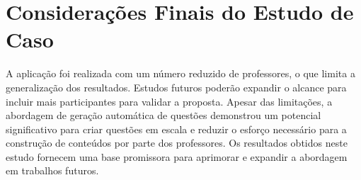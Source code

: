 \section{Considerações Finais do Estudo de Caso}
A aplicação foi realizada com um número reduzido de professores, o que limita a generalização dos resultados. Estudos futuros poderão expandir o alcance para incluir mais participantes para validar a proposta. Apesar das limitações, a abordagem de geração automática de questões demonstrou um potencial significativo para criar questões em escala e reduzir o esforço necessário para a construção de conteúdos por parte dos professores. Os resultados obtidos neste estudo fornecem uma base promissora para aprimorar e expandir a abordagem em trabalhos futuros. 
